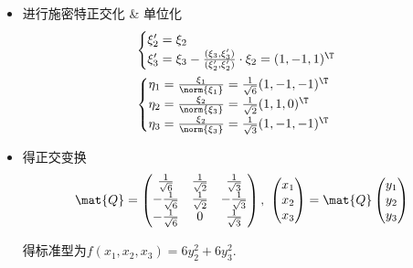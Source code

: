 \begin{solution}
\begin{itemize}
    由$(6\mat{E}-\mat{A})\mat{X}=\mat{O}$得$\xi_2=(1,1,0)^\T,\ \xi_3=(2,0,1)^\T$.
    \item 进行施密特正交化 \& 单位化
    \[
    \begin{aligned}
        &\begin{cases}
            \xi_2'=\xi_2\\
            \xi_3'=\xi_3-\frac{(\xi_3,\xi_3')}{(\xi_2',\xi_2')}\cdot\xi_2=(1,-1,1)^\T
        \end{cases}\\
        &\begin{cases}
            \eta_1=\frac{\xi_1}{\norm{\xi_1}}=\frac{1}{\sqrt6}(1,-1,-1)^\T\\
            \eta_2=\frac{\xi_2}{\norm{\xi_3}}=\frac{1}{\sqrt2}(1,1,0)^\T\\
            \eta_3=\frac{\xi_2}{\norm{\xi_3}}=\frac{1}{\sqrt3}(1,-1,-1)^\T
        \end{cases}
    \end{aligned}
    \]
    \item 得正交变换
    \[\mat{Q}=\begin{pmatrix}
        \tfrac{1}{\sqrt6} & \tfrac{1}{\sqrt2} & \tfrac{1}{\sqrt3}\\
        -\tfrac{1}{\sqrt6} & \tfrac{1}{\sqrt2} & -\tfrac{1}{\sqrt3}\\
        -\tfrac{1}{\sqrt6} & 0 & \tfrac{1}{\sqrt3}
    \end{pmatrix},\ 
    \begin{pmatrix}
        x_1\\x_2\\x_3
    \end{pmatrix}=\mat{Q}
    \begin{pmatrix}
        y_1\\y_2\\y_3
    \end{pmatrix}\]
    
    得标准型为$f(x_1,x_2,x_3)=6y_2^2+6y_3^2$.
\end{itemize}
\end{solution}


\vfill
{}